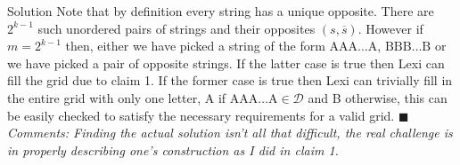 \documentclass{article}
\begin{document}
\begin{solution}{Solution}
Note that by definition every string has a unique opposite. There are
$2^{k-1}$ such unordered pairs of strings and their opposites
$(s, \overline{s})$. However if $m = 2^{k-1}$ then, either we have picked a
string of the form $\text{AAA}\ldots\text{A}$, $\text{BBB}\ldots\text{B}$ or
we have picked a pair of opposite strings. If the latter case is true then
Lexi can fill the grid due to claim 1. If the former case is true then
Lexi can trivially fill in the entire grid with only one letter, A if
$\text{AAA}\ldots\text{A} \in \mathcal{D}$ and B otherwise, this can be
easily checked to satisfy the necessary requirements for a valid grid.
$\blacksquare$\\

\textit{Comments: Finding the actual solution isn't all that difficult, the
real challenge is in properly describing one's construction as I did in
claim 1.}
\end{solution}
\end{document}
